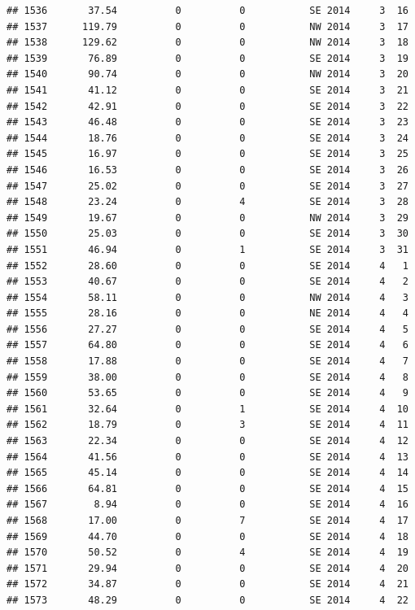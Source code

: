 \documentclass[
]{article}
\begin{document}
\begin{verbatim}
## 1536       37.54          0          0           SE 2014     3  16
## 1537      119.79          0          0           NW 2014     3  17
## 1538      129.62          0          0           NW 2014     3  18
## 1539       76.89          0          0           SE 2014     3  19
## 1540       90.74          0          0           NW 2014     3  20
## 1541       41.12          0          0           SE 2014     3  21
## 1542       42.91          0          0           SE 2014     3  22
## 1543       46.48          0          0           SE 2014     3  23
## 1544       18.76          0          0           SE 2014     3  24
## 1545       16.97          0          0           SE 2014     3  25
## 1546       16.53          0          0           SE 2014     3  26
## 1547       25.02          0          0           SE 2014     3  27
## 1548       23.24          0          4           SE 2014     3  28
## 1549       19.67          0          0           NW 2014     3  29
## 1550       25.03          0          0           SE 2014     3  30
## 1551       46.94          0          1           SE 2014     3  31
## 1552       28.60          0          0           SE 2014     4   1
## 1553       40.67          0          0           SE 2014     4   2
## 1554       58.11          0          0           NW 2014     4   3
## 1555       28.16          0          0           NE 2014     4   4
## 1556       27.27          0          0           SE 2014     4   5
## 1557       64.80          0          0           SE 2014     4   6
## 1558       17.88          0          0           SE 2014     4   7
## 1559       38.00          0          0           SE 2014     4   8
## 1560       53.65          0          0           SE 2014     4   9
## 1561       32.64          0          1           SE 2014     4  10
## 1562       18.79          0          3           SE 2014     4  11
## 1563       22.34          0          0           SE 2014     4  12
## 1564       41.56          0          0           SE 2014     4  13
## 1565       45.14          0          0           SE 2014     4  14
## 1566       64.81          0          0           SE 2014     4  15
## 1567        8.94          0          0           SE 2014     4  16
## 1568       17.00          0          7           SE 2014     4  17
## 1569       44.70          0          0           SE 2014     4  18
## 1570       50.52          0          4           SE 2014     4  19
## 1571       29.94          0          0           SE 2014     4  20
## 1572       34.87          0          0           SE 2014     4  21
## 1573       48.29          0          0           SE 2014     4  22

\end{verbatim}
\end{document}
